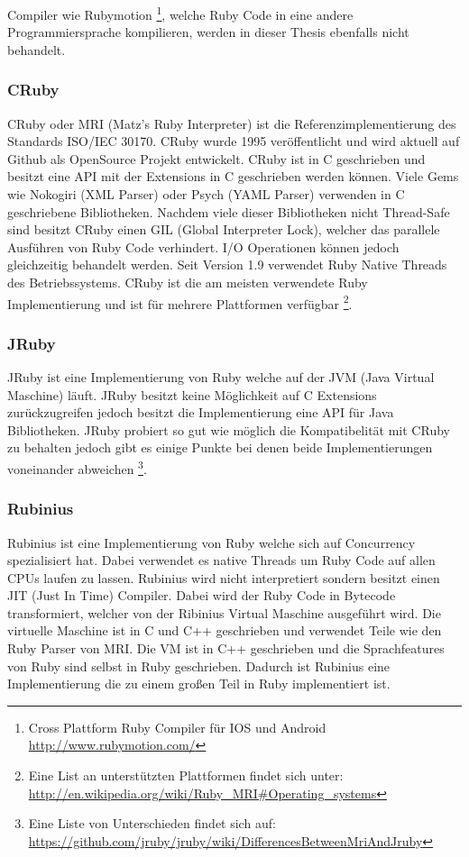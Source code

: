 Compiler wie Rubymotion \footnote{Cross Plattform Ruby Compiler für IOS und Android \url{http://www.rubymotion.com/}}, welche Ruby Code in eine andere Programmiersprache kompilieren, werden in dieser Thesis ebenfalls nicht behandelt.

\subsubsection{CRuby}
CRuby oder MRI (Matz's Ruby Interpreter) ist die Referenzimplementierung des Standards ISO/IEC 30170. CRuby wurde 1995 veröffentlicht und wird aktuell auf Github als OpenSource Projekt entwickelt. CRuby ist in C geschrieben und besitzt eine API mit der Extensions in C geschrieben werden können. Viele Gems wie Nokogiri (XML Parser) oder Psych (YAML Parser) verwenden in C geschriebene Bibliotheken. Nachdem viele dieser Bibliotheken nicht Thread-Safe sind besitzt CRuby einen GIL (Global Interpreter Lock), welcher das parallele Ausführen von Ruby Code verhindert. I/O Operationen können jedoch gleichzeitig behandelt werden. Seit Version 1.9 verwendet Ruby Native Threads des Betriebssystems. CRuby ist die am meisten verwendete Ruby Implementierung und ist für mehrere Plattformen verfügbar \footnote{Eine List an unterstützten Plattformen findet sich unter: \url{http://en.wikipedia.org/wiki/Ruby_MRI#Operating_systems}}.

\subsubsection{JRuby}

JRuby ist eine Implementierung von Ruby welche auf der JVM (Java Virtual Maschine) läuft. JRuby besitzt keine Möglichkeit auf C Extensions zurückzugreifen jedoch besitzt die Implementierung eine API für Java Bibliotheken. JRuby probiert so gut wie möglich die Kompatibelität mit CRuby zu behalten jedoch gibt es einige Punkte bei denen beide Implementierungen voneinander abweichen \footnote{Eine Liste von Unterschieden findet sich auf: \url{https://github.com/jruby/jruby/wiki/DifferencesBetweenMriAndJruby}}. 

\subsubsection{Rubinius}
Rubinius ist eine Implementierung von Ruby welche sich auf Concurrency spezialisiert hat. Dabei verwendet es native Threads um Ruby Code auf allen CPUs laufen zu lassen. Rubinius wird nicht interpretiert sondern besitzt einen JIT (Just In Time) Compiler. Dabei wird der Ruby Code in Bytecode transformiert, welcher von der Ribinius Virtual Maschine ausgeführt wird. Die virtuelle Maschine ist in C und C++ geschrieben und verwendet Teile wie den Ruby Parser von MRI. Die VM ist in C++ geschrieben und die Sprachfeatures von Ruby sind selbst in Ruby geschrieben. Dadurch ist Rubinius eine Implementierung die zu einem großen Teil in Ruby implementiert ist. 

